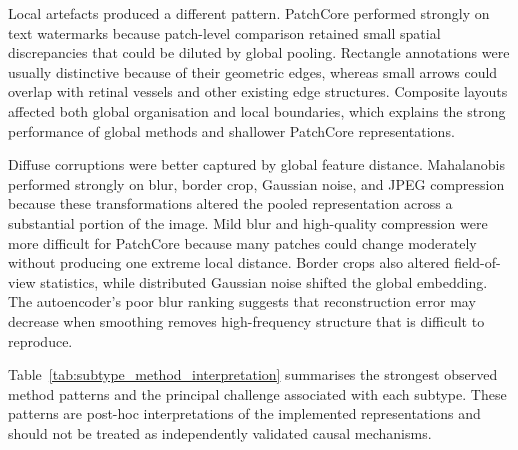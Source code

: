 \documentclass[fleqn,12pt]{olplainarticle}
\begin{document}
Local artefacts produced a different pattern. PatchCore performed strongly on
text watermarks because patch-level comparison retained small spatial
discrepancies that could be diluted by global pooling. Rectangle annotations
were usually distinctive because of their geometric edges, whereas small
arrows could overlap with retinal vessels and other existing edge structures.
Composite layouts affected both global organisation and local boundaries,
which explains the strong performance of global methods and shallower
PatchCore representations.

Diffuse corruptions were better captured by global feature distance.
Mahalanobis performed strongly on blur, border crop, Gaussian noise, and JPEG
compression because these transformations altered the pooled representation
across a substantial portion of the image. Mild blur and high-quality
compression were more difficult for PatchCore because many patches could
change moderately without producing one extreme local distance. Border crops
also altered field-of-view statistics, while distributed Gaussian noise
shifted the global embedding. The autoencoder's poor blur ranking suggests
that reconstruction error may decrease when smoothing removes
high-frequency structure that is difficult to reproduce.

Table~\ref{tab:subtype_method_interpretation} summarises the strongest observed
method patterns and the principal challenge associated with each subtype.
These patterns are post-hoc interpretations of the implemented
representations and should not be treated as independently validated causal
mechanisms.
\end{document}
